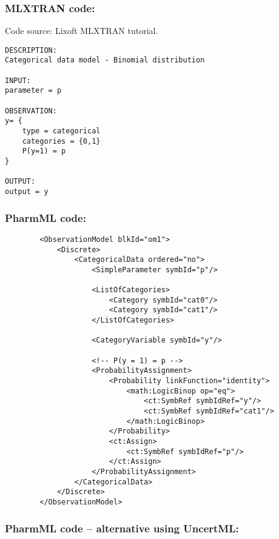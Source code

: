 \subsubsection{MLXTRAN code:}
Code source: Lixoft MLXTRAN tutorial.

\myStartLine
\lstset{language=MLXTRANcode}
\begin{lstlisting}
DESCRIPTION:
Categorical data model - Binomial distribution

INPUT:
parameter = p

OBSERVATION:
y= { 
	type = categorical 
	categories = {0,1} 
	P(y=1) = p 
}

OUTPUT:
output = y
\end{lstlisting}
\myEndLine

\subsubsection{PharmML code:}

\lstset{language=XML}
\begin{lstlisting}
        <ObservationModel blkId="om1">
            <Discrete>
                <CategoricalData ordered="no">
                    <SimpleParameter symbId="p"/>
                    
                    <ListOfCategories> 
                        <Category symbId="cat0"/>
                        <Category symbId="cat1"/>
                    </ListOfCategories>
                    
                    <CategoryVariable symbId="y"/>
                    
                    <!-- P(y = 1) = p -->
                    <ProbabilityAssignment>
                        <Probability linkFunction="identity">
                            <math:LogicBinop op="eq">
                                <ct:SymbRef symbIdRef="y"/>
                                <ct:SymbRef symbIdRef="cat1"/>
                            </math:LogicBinop>
                        </Probability>
                        <ct:Assign>
                            <ct:SymbRef symbIdRef="p"/>
                        </ct:Assign>
                    </ProbabilityAssignment>
                </CategoricalData>
            </Discrete>
        </ObservationModel>
\end{lstlisting}


\subsubsection{PharmML code -- alternative using UncertML:}

